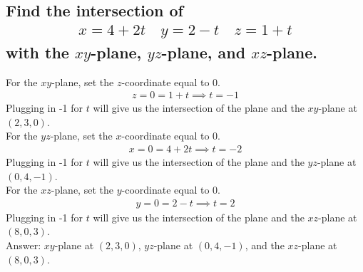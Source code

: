 \documentclass{article}
\begin{document}
\subsection{Find the intersection of 
	\begin{align*}
		x = 4 + 2t \quad y = 2 - t \quad z = 1 + t
	\end{align*}
	with the $xy$-plane, $yz$-plane, and $xz$-plane.
}
For the $xy$-plane, set the $z$-coordinate equal to 0.
\begin{align*}
	z = 0 = 1 + t \implies t = -1
\end{align*}
Plugging in -1 for $t$ will give us the intersection of the plane and the $xy$-plane at $(2,3,0)$. \\[10pt]
For the $yz$-plane, set the $x$-coordinate equal to 0.
\begin{align*}
	x = 0 = 4 + 2t \implies t = -2
\end{align*}
Plugging in -1 for $t$ will give us the intersection of the plane and the $yz$-plane at $(0, 4, -1)$. \\[10pt]
For the $xz$-plane, set the $y$-coordinate equal to 0.
\begin{align*}
	y = 0 = 2 - t \implies t = 2
\end{align*}
Plugging in -1 for $t$ will give us the intersection of the plane and the $xz$-plane at $(8,0, 3)$. \\[10pt]
Answer: $xy$-plane at $(2,3,0)$, $yz$-plane at $(0,4,-1)$, and the $xz$-plane at $(8,0,3)$.

\end{document}

